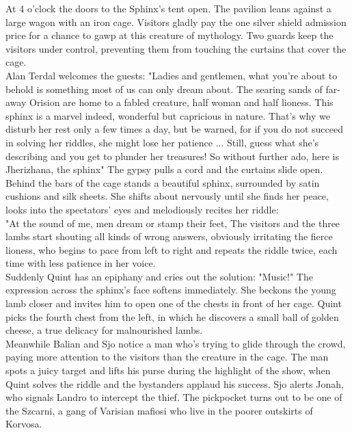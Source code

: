 At 4 o'clock the doors to the Sphinx's tent open. The pavilion leans against a large wagon with an iron cage. Visitors gladly pay the one silver shield admission price for a chance to gawp at this creature of mythology. Two guards keep the visitors under control, preventing them from touching the curtains that cover the cage.\\

Alan Terdal welcomes the guests: "Ladies and gentlemen, what you're about to behold is something most of us can only dream about. The searing sands of far-away Orision are home to a fabled creature, half woman and half lioness. This sphinx is a marvel indeed, wonderful but capricious in nature. That's why we disturb her rest only a few times a day, but be warned, for if you do not succeed in solving her riddles, she might lose her patience ... Still, guess what she's describing and you get to plunder her treasures! So without further ado, here is Jherizhana, the sphinx" The gypsy pulls a cord and the curtains slide open.\\

Behind the bars of the cage stands a beautiful sphinx, surrounded by satin cushions and silk sheets. She shifts about nervously until she finds her peace, looks into the spectators' eyes and melodiously recites her riddle:\\

"At the sound of me, men dream or stamp their feet,  The visitors and the three lambs start shouting all kinds of wrong answers, obviously irritating the fierce lioness, who begins to pace from left to right and repeats the riddle twice, each time with less patience in her voice.\\

Suddenly Quint has an epiphany and cries out the solution: "Music!" The expression across the sphinx's face softens immediately. She beckons the young lamb closer and invites him to open one of the chests in front of her cage. Quint picks the fourth chest from the left, in which he discovers a small ball of golden cheese, a true delicacy for malnourished lambs.\\

Meanwhile Balian and Sjo notice a man who's trying to glide through the crowd, paying more attention to the visitors than the creature in the cage. The man spots a juicy target and lifts his purse during the highlight of the show, when Quint solves the riddle and the bystanders applaud his success. Sjo alerts Jonah, who signals Landro to intercept the thief. The pickpocket turns out to be one of the Szcarni, a gang of Varisian mafiosi who live in the poorer outskirts of Korvosa.\\

